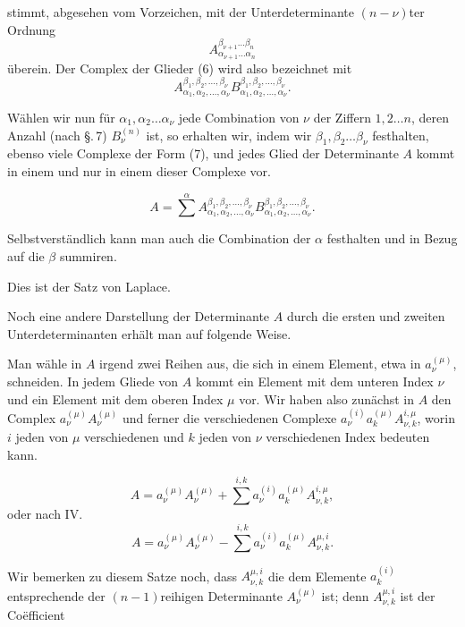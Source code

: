 
stimmt, abgesehen vom Vorzeichen, mit der Unterdeterminante \((n-\nu)\)ter Ordnung
\[
        A_{\alpha_{\nu+1}\ldots\alpha_n}^{\beta_{\nu+1}\ldots\beta_n}
\]
überein. Der Complex der Glieder (6) wird also bezeichnet mit
\begin{equation}
        A_{\alpha_1,\alpha_2,\ldots,\alpha_\nu}^{\beta_1,\beta_2,\ldots,\beta_\nu}
        B_{\alpha_1,\alpha_2,\ldots,\alpha_\nu}^{\beta_1,\beta_2,\ldots,\beta_\nu}.
\tag{7}
\end{equation}

Wählen wir nun für \(\alpha_1,\alpha_2\ldots\alpha_\nu\) jede Combination von \(\nu\) der Ziffern \(1,2\ldots n\), deren Anzahl (nach \S.\,7) \(B_\nu^{(n)}\) ist, so erhalten wir, indem wir \(\beta_1,\beta_2\ldots\beta_\nu\) festhalten, ebenso viele Complexe der Form (7), und jedes Glied der Determinante \(A\) kommt in einem und nur in einem dieser Complexe vor.

\begin{equation}
        A=\sum^{\alpha}
        A_{\alpha_1,\alpha_2,\ldots,\alpha_\nu}^{\beta_1,\beta_2,\ldots,\beta_\nu}
        B_{\alpha_1,\alpha_2,\ldots,\alpha_\nu}^{\beta_1,\beta_2,\ldots,\beta_\nu}.
\tag{8}
\end{equation}

Selbstverständlich kann man auch die Combination der \(\alpha\) festhalten und in Bezug auf die \(\beta\) summiren.

Dies ist der Satz von Laplace.

Noch eine andere Darstellung der Determinante \(A\) durch die ersten und zweiten Unterdeterminanten erhält man auf folgende Weise.

Man wähle in \(A\) irgend zwei Reihen aus, die sich in einem Element, etwa in \(a_\nu^{(\mu)}\), schneiden. In jedem Gliede von \(A\) kommt ein Element mit dem unteren Index \(\nu\) und ein Element mit dem oberen Index \(\mu\) vor. Wir haben also zunächst in \(A\) den Complex \(a_\nu^{(\mu)}A_\nu^{(\mu)}\) und ferner die verschiedenen Complexe \(a_\nu^{(i)}a_k^{(\mu)}A_{\nu,k}^{i,\mu}\), worin \(i\) jeden von \(\mu\) verschiedenen und \(k\) jeden von \(\nu\) verschiedenen Index bedeuten kann.

\begin{equation}
        A=a_\nu^{(\mu)}A_\nu^{(\mu)}+
        \sum^{i,k} a_\nu^{(i)}a_k^{(\mu)}A_{\nu,k}^{i,\mu},
\tag{9}
\end{equation}
oder nach IV.
\begin{equation}
        A=a_\nu^{(\mu)}A_\nu^{(\mu)}-
        \sum^{i,k} a_\nu^{(i)}a_k^{(\mu)}A_{\nu,k}^{\mu,i}.
\tag{10}
\end{equation}

Wir bemerken zu diesem Satze noch, dass \(A_{\nu,k}^{\mu,i}\) die dem Elemente \(a_k^{(i)}\) entsprechende  der \((n-1)\)reihigen Determinante \(A_\nu^{(\mu)}\) ist; denn \(A_{\nu,k}^{\mu,i}\) ist der Coëfficient
